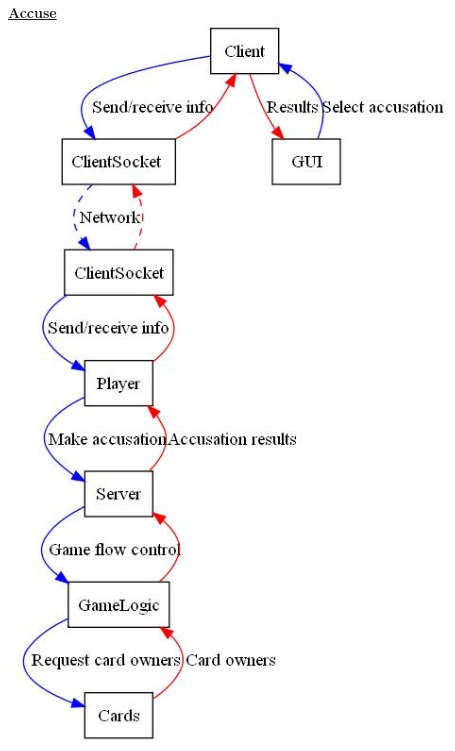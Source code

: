 \begin{flushleft}
	\newpage
	{\LARGE \underline{\textbf{Accuse}}} \\
	\includegraphics[height=7.5in]{../DesignDocumentation/06_ClassCollaborationDiagrams/accuse_REV01.jpg}
\end{flushleft}